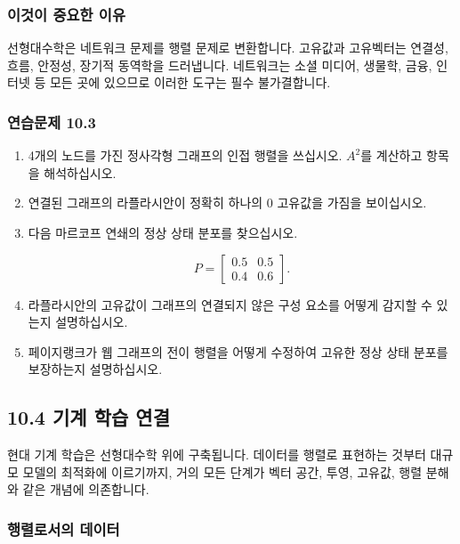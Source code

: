 \documentclass[
  12pt,
  a4paper,
]{article}
\begin{document}
\subsubsection{이것이 중요한 이유}\label{why-this-matters-38}

선형대수학은 네트워크 문제를 행렬 문제로 변환합니다. 고유값과 고유벡터는 연결성, 흐름, 안정성, 장기적 동역학을 드러냅니다. 네트워크는 소셜 미디어, 생물학, 금융, 인터넷 등 모든 곳에 있으므로 이러한 도구는 필수 불가결합니다.

\subsubsection{연습문제 10.3}\label{exercises-103}

\begin{enumerate}
\def\labelenumi{\arabic{enumi}.}
\item
  4개의 노드를 가진 정사각형 그래프의 인접 행렬을 쓰십시오. \(A^2\)를 계산하고 항목을 해석하십시오.
\item
  연결된 그래프의 라플라시안이 정확히 하나의 0 고유값을 가짐을 보이십시오.
\item
  다음 마르코프 연쇄의 정상 상태 분포를 찾으십시오.

  \[P = \begin{bmatrix} 0.5 & 0.5 \\ 0.4 & 0.6 \end{bmatrix}.\]
\item
  라플라시안의 고유값이 그래프의 연결되지 않은 구성 요소를 어떻게 감지할 수 있는지 설명하십시오.
\item
  페이지랭크가 웹 그래프의 전이 행렬을 어떻게 수정하여 고유한 정상 상태 분포를 보장하는지 설명하십시오.
\end{enumerate}

\subsection{10.4 기계 학습 연결}\label{104-machine-learning-connections}

현대 기계 학습은 선형대수학 위에 구축됩니다. 데이터를 행렬로 표현하는 것부터 대규모 모델의 최적화에 이르기까지, 거의 모든 단계가 벡터 공간, 투영, 고유값, 행렬 분해와 같은 개념에 의존합니다.

\subsubsection{행렬로서의 데이터}\label{data-as-matrices}
\end{document}
